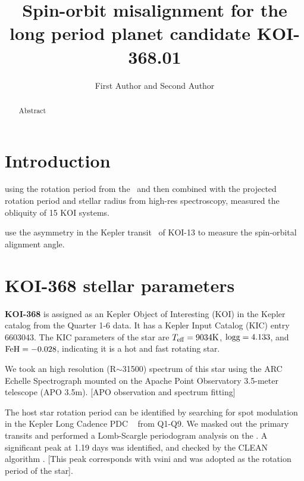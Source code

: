 \documentclass[preprint]{emulateapj}
\makeatletter
\newcommand{\myemail}{email@email.com}
\makeatother
\begin{document}
\linenumbers

\title{Spin-orbit misalignment for the long period planet candidate KOI-368.01}

\author{First Author and
Second Author}

\altaffiltext{1}{Affil2; \email{\myemail}}

\begin{abstract}
Abstract
\end{abstract}


\section{Introduction}
\label{sec:introduction}

\citet{Hirano:2012} 
using the rotation period from the \lc\ and 
then combined with the projected rotation period and stellar radius from 
high-res spectroscopy, measured the obliquity of 15 KOI systems. 

\citet{Barnes:2011} use the asymmetry in the Kepler transit \lc\ of 
KOI-13 to measure the spin-orbital alignment angle. 



\section{KOI-368 stellar parameters}
\label{sec:host-star-parameters}

{\bf KOI-368} is assigned as an Kepler Object of Interesting (KOI) in the 
\citet{Batalha:2013} Kepler catalog from the Quarter 1-6 data. It has a 
Kepler Input Catalog (KIC) entry 6603043. The KIC parameters of the star are 
$T_{\rm eff} = 9034 {\rm K}$, $\rm logg=4.133$, and $\rm FeH = -0.028$, 
indicating it is a hot and fast rotating star.

We took an high resolution (R$\sim$31500) spectrum of this star using 
the ARC Echelle Spectrograph mounted on the Apache Point Observatory  
3.5-meter telescope (APO 3.5m).
[APO observation and spectrum fitting]

The host star rotation period can be identified by searching for spot
modulation in the Kepler Long Cadence PDC \lcs\ \citep{Smith:2012} 
from Q1-Q9. We masked out the primary transits and performed a Lomb-Scargle 
periodogram \citep[][]{Lomb1976,Scargle1982} analysis
on the \lcs. A significant peak at 1.19 days was identified,
and checked by the CLEAN algorithm \citep{Roberts1987}. [This peak 
corresponds with vsini and was adopted as the rotation period of the star].
\end{document}
